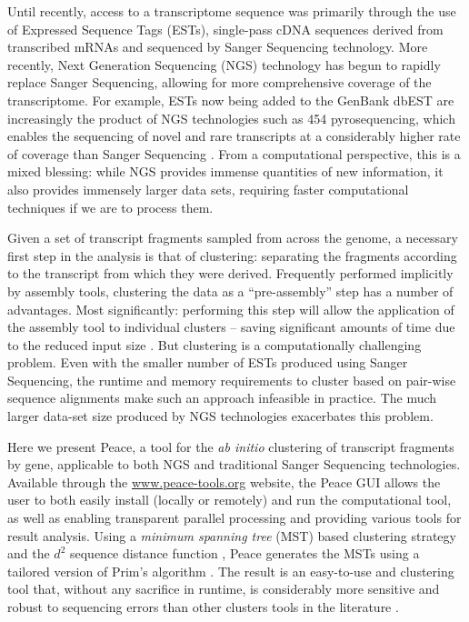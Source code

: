 \documentclass[a4,center,fleqn]{NAR}
\begin{document}
Until recently, access to a transcriptome sequence was primarily
through the use of Expressed Sequence Tags (ESTs), single-pass cDNA
sequences derived from transcribed mRNAs and sequenced by Sanger
Sequencing technology.  More recently, Next Generation Sequencing
(NGS) technology has begun to rapidly replace Sanger Sequencing,
allowing for more comprehensive coverage of the transcriptome.  For
example, ESTs now being added to the GenBank dbEST are increasingly
the product of NGS technologies such as 454 pyrosequencing, which
enables the sequencing of novel and rare transcripts at a considerably
higher rate of coverage than Sanger Sequencing
\cite{Cheung2006,Emrich2007}.  From a computational perspective, this
is a mixed blessing: while NGS provides immense quantities of new
information, it also provides immensely larger data sets, requiring
faster computational techniques if we are to process them.

Given a set of transcript fragments sampled from across the genome, a
necessary first step in the analysis is that of clustering: separating
the fragments according to the transcript from which they were
derived.  Frequently performed implicitly by assembly tools,
clustering the data as a ``pre-assembly'' step has a number of
advantages.  Most significantly: performing this step will
allow the application of the assembly tool to individual clusters --
saving significant amounts of time due to the reduced input size
\cite{Hazelhurst08a}.  But clustering is a computationally challenging
problem.  Even with the smaller number of ESTs produced using Sanger
Sequencing, the runtime and memory requirements to cluster based on
pair-wise sequence alignments make such an approach infeasible in practice.  The
much larger data-set size produced by NGS 
technologies exacerbates this problem.

Here we present {\sc Peace}, a tool for the {\it ab initio} clustering
of transcript fragments by gene, applicable to both NGS and
traditional Sanger Sequencing technologies.  Available through the
\href{http://www.peace-tools.org}{www.peace-tools.org} website, the
{\sc Peace} GUI allows the user to both easily install (locally or remotely)
and run the computational tool, as well as enabling transparent
parallel processing and providing various tools for result analysis.
Using a {\it minimum spanning tree} (MST) based clustering strategy
\cite{Jain99,Wan08} and the $d^2$ sequence distance function
\cite{Hide94}, {\sc Peace} generates the MSTs using a tailored version
of Prim's algorithm \cite{Prim57}.  The result is an easy-to-use and
clustering tool that, without any sacrifice in runtime, is
considerably more sensitive and robust to sequencing errors than other
clusters tools in the literature \cite{Burke99,Slater00,
  Huang99,Parkinson02,Kalyanaraman03,Malde03,Ptitsyn05,Hazelhurst08a, Picardi09}.
\end{document}
